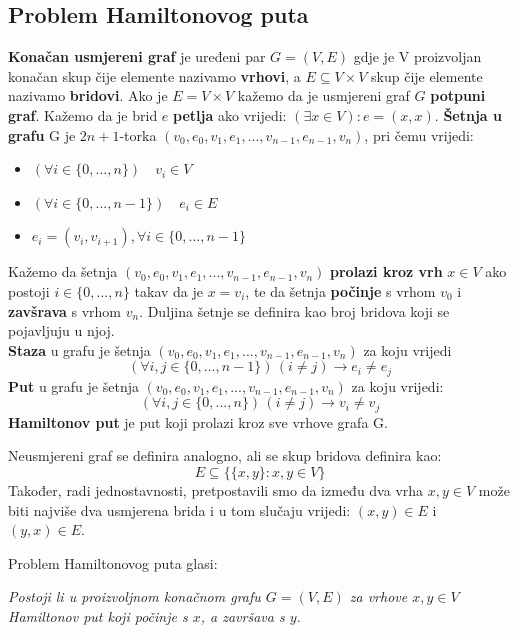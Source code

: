 \documentclass[a4paper,oneside,12pt]{memoir} %
\begin{document}
\begin{spacing}{1.5}
\subsection{Problem Hamiltonovog puta}
\begin{defn}
\textbf{Konačan usmjereni graf} je uređeni par $G=(V,E)$ gdje je V proizvoljan konačan skup čije elemente nazivamo \textbf{vrhovi}, a $E\subseteq V \times V$ skup čije elemente nazivamo \textbf{bridovi}. Ako je $E=V\times	V$ kažemo da je usmjereni graf $G$ \textbf{potpuni graf}. Kažemo da je brid $e$ \textbf{petlja} ako vrijedi:
$(\exists x \in V) : e=(x,x)$.
\textbf{Šetnja u grafu} G je $2n+1$-torka $(v_0,e_0,v_1,e_1,...,v_{n-1},e_{n-1}, v_{n})$, pri čemu vrijedi:
\begin{itemize}
	\item $(\forall i \in \{0,...,n\}) \quad v_i \in V$
	\item $(\forall i \in \{0,...,n-1\}) \quad e_i \in E$
	\item $e_i=(v_i, v_{i+1}), \forall i \in \{0,...,n-1\}$
\end{itemize}
Kažemo da šetnja  $(v_0,e_0,v_1,e_1,...,v_{n-1},e_{n-1}, v_{n})$ \textbf{prolazi kroz vrh} $x \in V$ ako postoji $i \in \{0,...,n\}$ takav da je $x=v_i$, te da šetnja \textbf{počinje} s vrhom $v_0$ i \textbf{zavšrava} s vrhom $v_n$. Duljina šetnje se definira kao broj bridova koji se pojavljuju u njoj.\\
\textbf{Staza} u grafu je šetnja $(v_0,e_0,v_1,e_1,...,v_{n-1},e_{n-1}, v_{n})$ za koju vrijedi 
\[(\forall i,j \in \{0,...,n-1\})\, (i\neq j) \to e_i \neq e_j\] \textbf{Put} u grafu je šetnja $(v_0,e_0,v_1,e_1,...,v_{n-1},e_{n-1}, v_{n})$ za koju vrijedi:
\[(\forall i,j \in \{0,...,n\})\, (i\neq j) \to v_i \neq v_j\] \textbf{Hamiltonov put} je put koji prolazi kroz sve vrhove grafa G.
\end{defn}
\begin{rem}
Neusmjereni graf se definira analogno, ali se skup bridova definira kao:
\[E\subseteq \{\{x,y\} : x, y \in V\}\]
Također, radi jednostavnosti, pretpostavili smo da između dva vrha $x,y \in V$ može biti najviše dva usmjerena brida i u tom slučaju vrijedi: $(x,y) \in E$ i $(y,x) \in E$.  
\end{rem}
Problem Hamiltonovog puta glasi:\\
\begin{center}
\textit{Postoji li u proizvoljnom konačnom grafu $G=(V,E)$ za vrhove $x,y \in V$  Hamiltonov put koji počinje s $x$, a završava s $y$.}
\end{center}

\end{spacing}
\end{document}
